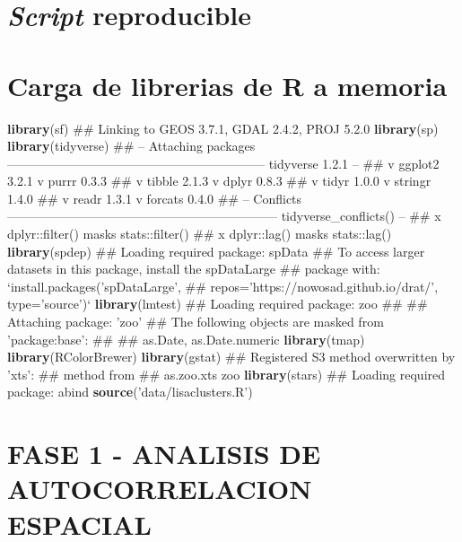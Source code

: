 \documentclass[11pt,]{article}
\newenvironment{Shaded}{\begin{snugshade}}{\end{snugshade}}
\newcommand{\KeywordTok}[1]{\textcolor[rgb]{0.13,0.29,0.53}{\textbf{#1}}}
\newcommand{\StringTok}[1]{\textcolor[rgb]{0.31,0.60,0.02}{#1}}
\newcommand{\NormalTok}[1]{#1}
\begin{document}
\section{\texorpdfstring{\emph{Script}
reproducible}{Script reproducible}}\label{script-reproducible}

\section{Carga de librerias de R a
memoria}\label{carga-de-librerias-de-r-a-memoria}

\begin{Shaded}
\begin{Highlighting}[]
\KeywordTok{library}\NormalTok{(sf)}
\NormalTok{## Linking to GEOS 3.7.1, GDAL 2.4.2, PROJ 5.2.0}
\KeywordTok{library}\NormalTok{(sp)}
\KeywordTok{library}\NormalTok{(tidyverse)}
\NormalTok{## -- Attaching packages -------------------------------------------------------------- tidyverse 1.2.1 --}
\NormalTok{## v ggplot2 3.2.1     v purrr   0.3.3}
\NormalTok{## v tibble  2.1.3     v dplyr   0.8.3}
\NormalTok{## v tidyr   1.0.0     v stringr 1.4.0}
\NormalTok{## v readr   1.3.1     v forcats 0.4.0}
\NormalTok{## -- Conflicts ----------------------------------------------------------------- tidyverse_conflicts() --}
\NormalTok{## x dplyr::filter() masks stats::filter()}
\NormalTok{## x dplyr::lag()    masks stats::lag()}
\KeywordTok{library}\NormalTok{(spdep)}
\NormalTok{## Loading required package: spData}
\NormalTok{## To access larger datasets in this package, install the spDataLarge}
\NormalTok{## package with: `install.packages('spDataLarge',}
\NormalTok{## repos='https://nowosad.github.io/drat/', type='source')`}
\KeywordTok{library}\NormalTok{(lmtest)}
\NormalTok{## Loading required package: zoo}
\NormalTok{## }
\NormalTok{## Attaching package: 'zoo'}
\NormalTok{## The following objects are masked from 'package:base':}
\NormalTok{## }
\NormalTok{##     as.Date, as.Date.numeric}
\KeywordTok{library}\NormalTok{(tmap)}
\KeywordTok{library}\NormalTok{(RColorBrewer)}
\KeywordTok{library}\NormalTok{(gstat)}
\NormalTok{## Registered S3 method overwritten by 'xts':}
\NormalTok{##   method     from}
\NormalTok{##   as.zoo.xts zoo}
\KeywordTok{library}\NormalTok{(stars)}
\NormalTok{## Loading required package: abind}
\KeywordTok{source}\NormalTok{(}\StringTok{'data/lisaclusters.R'}\NormalTok{)}
\end{Highlighting}
\end{Shaded}

\section{FASE 1 - ANALISIS DE AUTOCORRELACION
ESPACIAL}\label{fase-1---analisis-de-autocorrelacion-espacial}
\end{document}
